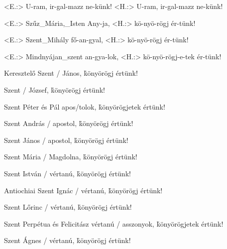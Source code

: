 \documentclass[twoside]{article}
\begin{document}
\begin{gregosheet}
            {   <E.:> U-ram, ir-gal-mazz ne-künk! <H.:> U-ram, ir-gal-mazz ne-künk!}
\end{gregosheet}

\begin{gregosheet}
            {   <E.:> Szűz_Mária,_Isten Any-ja, <H.:> kö-nyö-rögj ér-tünk!}
\end{gregosheet}

\begin{gregosheet}
            {   <E.:> Szent_Mihály fő-an-gyal, <H.:> kö-nyö-rögj ér-tünk!}
\end{gregosheet}

\begin{gregosheet}
            {   <E.:> Mindnyájan_szent an-gya-lok, <H.:> kö-nyö-rögj-e-tek ér-tünk!}
\end{gregosheet}

\e Keresztelő Szent / János,                          \hfill\h könyörögj értünk!

\e Szent / József,                                    \hfill\h könyörögj értünk!

\e Szent Péter és Pál apos/tolok,                     \hfill\h könyörögjetek értünk!

\e Szent András / apostol,                            \hfill\h könyörögj értünk!

\e Szent János / apostol,                             \hfill\h könyörögj értünk!

\e Szent Mária / Magdolna,                            \hfill\h könyörögj értünk!

\e Szent István / vértanú,                            \hfill\h könyörögj értünk!

\e Antiochiai Szent Ignác / vértanú,                  \hfill\h könyörögj értünk!

\e Szent Lőrinc / vértanú,                            \hfill\h könyörögj értünk!

\e Szent Perpétua és Felicitász vértanú / asszonyok,  \hfill\h könyörögjetek értünk!

\e Szent Ágnes / vértanú,                             \hfill\h könyörögj értünk!
\end{document}
